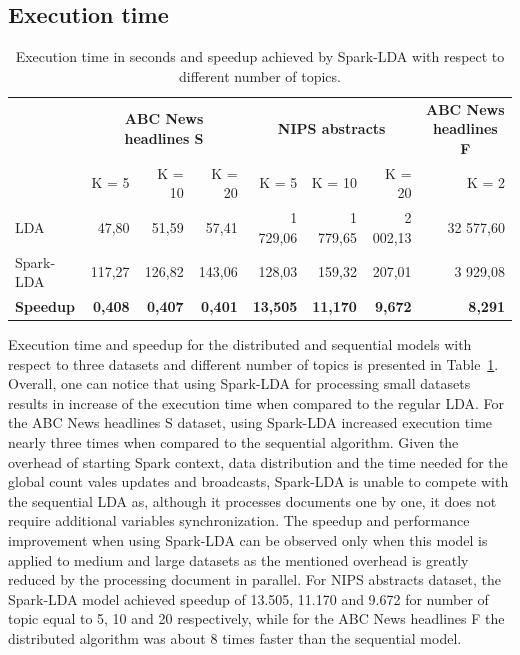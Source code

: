 \documentclass[journal]{IEEEtran}
\begin{document}
\subsection{Execution time}

\renewcommand{\arraystretch}{1.2}
\begin{table}[t]
\centering
\caption{Execution time in seconds and speedup achieved by Spark-LDA with respect to different number of topics.}
\begin{tabular}{lrrrrrrr} \toprule
                 & \multicolumn{3}{c}{\textbf{ABC News headlines S}} & \multicolumn{3}{c}{\textbf{NIPS abstracts}}        & \multicolumn{1}{c}{\textbf{ABC News headlines F}} \\
                 & K = 5             & K = 10           & K = 20           & K = 5           & K = 10          & K = 20         & K = 2                                           \\ \midrule
LDA              & 47,80             & 51,59            & 57,41            & 1 729,06        & 1 779,65        & 2 002,13       & 32 577,60                                       \\
Spark-LDA        & 117,27            & 126,82           & 143,06           & 128,03          & 159,32          & 207,01         & 3 929,08                                        \\ \midrule
\textbf{Speedup} & \textbf{0,408}    & \textbf{0,407}   & \textbf{0,401}   & \textbf{13,505} & \textbf{11,170} & \textbf{9,672} & \textbf{8,291}  \\ \bottomrule                         
\end{tabular}
\label{tab:speedup}
\end{table}

Execution time and speedup for the distributed and sequential models with respect to three datasets and different number of topics is presented in Table~\ref{tab:speedup}. Overall, one can notice that using Spark-LDA for processing small     datasets results in increase of the execution time when compared to the regular LDA.  For the ABC News headlines S dataset, using Spark-LDA increased execution time nearly three times when compared to the sequential algorithm. Given the overhead of starting Spark context, data distribution and the time needed for the global count vales updates and broadcasts, Spark-LDA is unable to compete with the sequential LDA as, although it processes documents one by one, it does not require additional variables synchronization. The speedup and performance improvement  when using Spark-LDA can be observed only when this model is applied to medium and large datasets as the mentioned overhead is greatly reduced by the processing document in parallel. For NIPS abstracts dataset, the Spark-LDA model achieved speedup of 13.505, 11.170 and 9.672 for number of topic equal to 5, 10 and 20 respectively, while for the ABC News headlines F the distributed algorithm was about 8 times faster than the sequential model.
\end{document}
